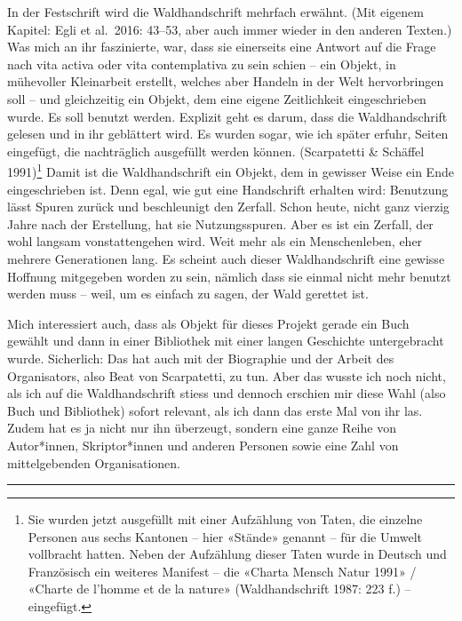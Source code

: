 \documentclass[a4paper,
fontsize=11pt,
oneside,
numbers=noperiodatend,
parskip=half-,
bibliography=totoc,
final
]{scrartcl}
\begin{document}
In der Festschrift wird die Waldhandschrift mehrfach erwähnt. (Mit
eigenem Kapitel: Egli et al.~2016: 43--53, aber auch immer wieder in den
anderen Texten.) Was mich an ihr faszinierte, war, dass sie einerseits
eine Antwort auf die Frage nach vita activa oder vita contemplativa zu
sein schien -- ein Objekt, in mühevoller Kleinarbeit erstellt, welches
aber Handeln in der Welt hervorbringen soll -- und gleichzeitig ein
Objekt, dem eine eigene Zeitlichkeit eingeschrieben wurde. Es soll
benutzt werden. Explizit geht es darum, dass die Waldhandschrift gelesen
und in ihr geblättert wird. Es wurden sogar, wie ich später erfuhr,
Seiten eingefügt, die nachträglich ausgefüllt werden können.
(Scarpatetti \& Schäffel 1991)\footnote{Sie wurden jetzt ausgefüllt mit
  einer Aufzählung von Taten, die einzelne Personen aus sechs Kantonen
  -- hier «Stände» genannt -- für die Umwelt vollbracht hatten. Neben
  der Aufzählung dieser Taten wurde in Deutsch und Französisch ein
  weiteres Manifest -- die «Charta Mensch Natur 1991» / «Charte de
  l'homme et de la nature» (Waldhandschrift 1987: 223 f.) -- eingefügt.}
Damit ist die Waldhandschrift ein Objekt, dem in gewisser Weise ein Ende
eingeschrieben ist. Denn egal, wie gut eine Handschrift erhalten wird:
Benutzung lässt Spuren zurück und beschleunigt den Zerfall. Schon heute,
nicht ganz vierzig Jahre nach der Erstellung, hat sie Nutzungsspuren.
Aber es ist ein Zerfall, der wohl langsam vonstattengehen wird. Weit
mehr als ein Menschenleben, eher mehrere Generationen lang. Es scheint
auch dieser Waldhandschrift eine gewisse Hoffnung mitgegeben worden zu
sein, nämlich dass sie einmal nicht mehr benutzt werden muss -- weil, um
es einfach zu sagen, der Wald gerettet ist.

Mich interessiert auch, dass als Objekt für dieses Projekt gerade ein
Buch gewählt und dann in einer Bibliothek mit einer langen Geschichte
untergebracht wurde. Sicherlich: Das hat auch mit der Biographie und der
Arbeit des Organisators, also Beat von Scarpatetti, zu tun. Aber das
wusste ich noch nicht, als ich auf die Waldhandschrift stiess und
dennoch erschien mir diese Wahl (also Buch und Bibliothek) sofort
relevant, als ich dann das erste Mal von ihr las. Zudem hat es ja nicht
nur ihn überzeugt, sondern eine ganze Reihe von Autor*innen,
Skriptor*innen und anderen Personen sowie eine Zahl von mittelgebenden
Organisationen.

\begin{center}\rule{0.5\linewidth}{0.5pt}\end{center}
\end{document}

